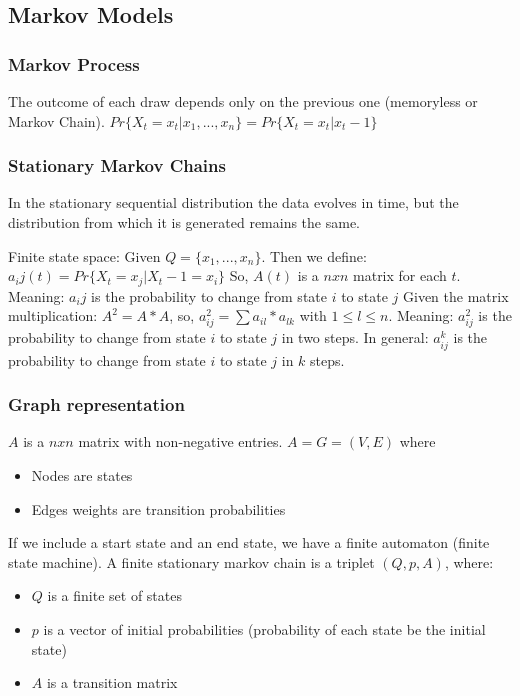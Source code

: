 \documentclass[main]{subfiles}
\begin{document}
\subsection{Markov Models}
\subsubsection{Markov Process}
The outcome of each draw depends only on the previous one (memoryless or Markov Chain).
$Pr\{X_t = x_t| x_1, . . . , x_n\} = Pr\{X_t = x_t | x_t-1\}$

\subsubsection{Stationary Markov Chains}
In the stationary sequential distribution the data evolves in time, but the distribution from
which it is generated remains the same.

Finite state space: Given $Q = \{x_1, . . . , x_n\}$. Then we define:
$a_ij(t) = Pr\{X_t = x_j | X_t-1 = x_i\}$
So, $A(t)$ is a $n x n$ matrix for each $t$.
Meaning: $a_ij$ is the probability to change from state $i$ to state $j$
Given the matrix multiplication: $A^2 = A * A$, so, $a_{ij}^2 = \sum a_{il} * a_{lk} $ with $1 \leq l \leq n$.
Meaning: $a_{ij}^2$ is the probability to change from state $i$ to state $j$ in two steps. In general:
$a_{ij}^k$ is the probability to change from state $i$ to state $j$ in $k$ steps.

\subsubsection{Graph representation}
$A$ is a $n x n$ matrix with non-negative entries.
$A = G = (V,E)$ where
\begin{itemize}
\item Nodes are states
\item Edges weights are transition probabilities
\end{itemize}
If we include a start state and an end state, we have a finite automaton (finite state machine).
A finite stationary markov chain is a triplet $(Q, p, A)$, where:
\begin{itemize}
\item $Q$ is a finite set of states
\item $p$ is a vector of initial probabilities (probability of each state be the initial state)
\item $A$ is a transition matrix
\end{itemize}
\end{document}
